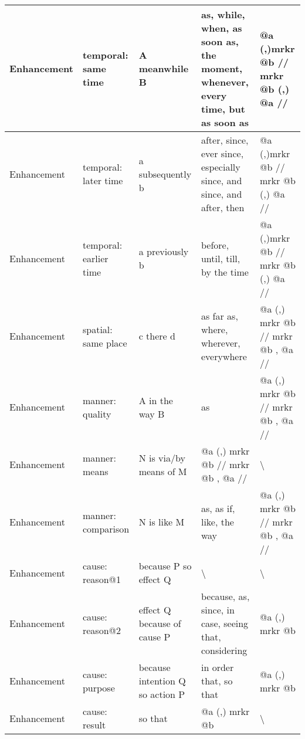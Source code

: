 \begin{landscape}
\begin{longtable}{|l|l|p{3cm}|p{5cm}|p{5cm}|}
			Enhancement & temporal: same time    & A meanwhile B                        & as, while, when, as soon as, the moment, whenever, every time, but as soon as & @a (,)mrkr @b // mrkr @b (,) @a //           \\ \hline
			Enhancement & temporal: later time   & a subsequently b                     & after, since, ever since, especially since, and since, and after, then        & @a (,)mrkr @b // mrkr @b (,) @a //           \\ \hline
			Enhancement & temporal: earlier time & a previously b                       & before, until, till, by the time                                              & @a (,)mrkr @b // mrkr @b (,) @a //           \\ \hline
			Enhancement & spatial: same place    & c there d                            & as far as, where, wherever, everywhere                                        & @a (,) mrkr @b // mrkr @b , @a //            \\ \hline
			Enhancement & manner: quality        & A in the way B                       & as                                                                            & @a (,) mrkr @b // mrkr @b , @a //            \\ \hline
			Enhancement & manner: means          & N is via/by means of M               & @a (,) mrkr @b // mrkr @b , @a //                                             & \textbackslash                               \\ \hline
			Enhancement & manner: comparison     & N is like M                          & as, as if, like, the way                                                      & @a (,) mrkr @b // mrkr @b , @a //            \\ \hline
			Enhancement & cause: reason@1        & because P so effect Q                & \textbackslash                                                                & \textbackslash                               \\ \hline
			Enhancement & cause: reason@2        & effect Q because of cause P          & because, as, since, in case, seeing that, considering                         & @a (,) mrkr @b                               \\ \hline
			Enhancement & cause: purpose         & because intention Q so action P      & in order that, so that                                                        & @a (,) mrkr @b                               \\ \hline
			Enhancement & cause: result          & so that                              & @a (,) mrkr @b                                                                & \textbackslash                               \\ \hline

\end{longtable}
\end{landscape}

